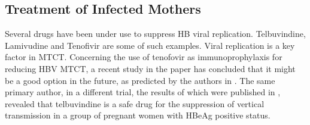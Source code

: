 \subsection{Treatment of Infected Mothers}
Several drugs have been under use to suppress HB viral replication. Telbuvindine, Lamivudine and Tenofivir are some of such examples. Viral replication is a key factor in MTCT. Concerning the use of tenofovir as immunoprophylaxis for reducing HBV MTCT, a recent study in the paper \cite{pan2016TenofivirToPrevent} has concluded that it might be a good option in the future, as predicted by the authors in \cite{xu2013nextstep}. The same primary author, in a different trial, the results of which were published in \cite{pan2012telbivudine}, revealed that telbuvindine is a safe drug for the suppression of vertical transmission in a group of pregnant women with HBeAg positive status.